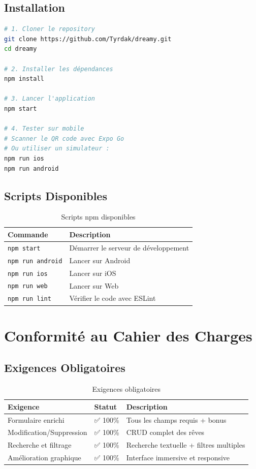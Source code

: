 \documentclass[12pt,a4paper]{article}
\begin{document}
\subsection{Installation}

\begin{lstlisting}[language=bash, caption=Commandes d'installation]
# 1. Cloner le repository
git clone https://github.com/Tyrdak/dreamy.git
cd dreamy

# 2. Installer les dépendances
npm install

# 3. Lancer l'application
npm start

# 4. Tester sur mobile
# Scanner le QR code avec Expo Go
# Ou utiliser un simulateur :
npm run ios
npm run android
\end{lstlisting}

\subsection{Scripts Disponibles}

\begin{table}[H]
\centering
\begin{tabular}{|l|l|}
\hline
\textbf{Commande} & \textbf{Description} \\
\hline
\texttt{npm start} & Démarrer le serveur de développement \\
\texttt{npm run android} & Lancer sur Android \\
\texttt{npm run ios} & Lancer sur iOS \\
\texttt{npm run web} & Lancer sur Web \\
\texttt{npm run lint} & Vérifier le code avec ESLint \\
\hline
\end{tabular}
\caption{Scripts npm disponibles}
\end{table}

\section{Conformité au Cahier des Charges}

\subsection{Exigences Obligatoires}

\begin{table}[H]
\centering
\begin{tabular}{|l|l|l|}
\hline
\textbf{Exigence} & \textbf{Statut} & \textbf{Description} \\
\hline
Formulaire enrichi & ✅ 100\% & Tous les champs requis + bonus \\
Modification/Suppression & ✅ 100\% & CRUD complet des rêves \\
Recherche et filtrage & ✅ 100\% & Recherche textuelle + filtres multiples \\
Amélioration graphique & ✅ 100\% & Interface immersive et responsive \\
\hline
\end{tabular}
\caption{Exigences obligatoires}
\end{table}
\end{document}
